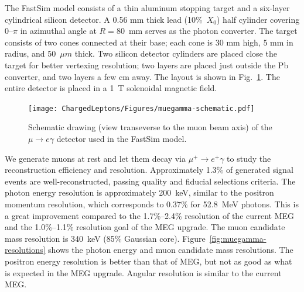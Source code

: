 The FastSim model consists of a thin aluminum stopping target and a six-layer
cylindrical silicon detector. A 0.56 mm thick lead (10\%~$X_0$) half cylinder
covering 0--$\pi$ in azimuthal angle at $R=80$~mm serves as the photon converter. 
The target consists of two cones connected at their base; each cone is 30 mm 
high, 5 mm in radius, and 50~$\mu m$ thick.
Two silicon detector cylinders are placed close the target for better vertexing resolution;
two layers are placed just outside the Pb converter, and two layers a few cm away. The layout is shown in
Fig.~\ref{fig:muegamma-scheme}. The entire detector is placed in a 1~T
solenoidal magnetic field. 

\begin{figure}[htbp]
   \centering
   \texttt{[image: ChargedLeptons/Figures/muegamma-schematic.pdf]} 
   \caption{Schematic drawing (view transeverse to the muon beam axis) of the $\mu\to e\gamma$ detector used in the 
   FastSim model. }
   \label{fig:muegamma-scheme}
\end{figure}

We generate muons at rest and let them decay via $\mu^+\to e^+\gamma$ to study
the reconstruction efficiency and resolution. Approximately 1.3\% of generated
signal events are well-reconstructed, passing quality and fiducial selections criteria.
The photon energy resolution is approximately 200~keV, similar to the positron momentum
resolution, which corresponds to $0.37\%$ for 52.8~MeV photons. This is a great
improvement compared to the 1.7\%--2.4\% resolution of the current MEG and the  1.0\%--1.1\% resolution goal of the MEG
upgrade. The muon candidate mass resolution is 340~keV (85\% Gaussian core).
Figure~\ref{fig:muegamma-resolutions} shows the photon energy and muon candidate 
mass resolutions. The positron energy resolution is better than that of MEG, but not
as good as what is expected in the MEG upgrade. Angular resolution is similar to  the
current MEG.

